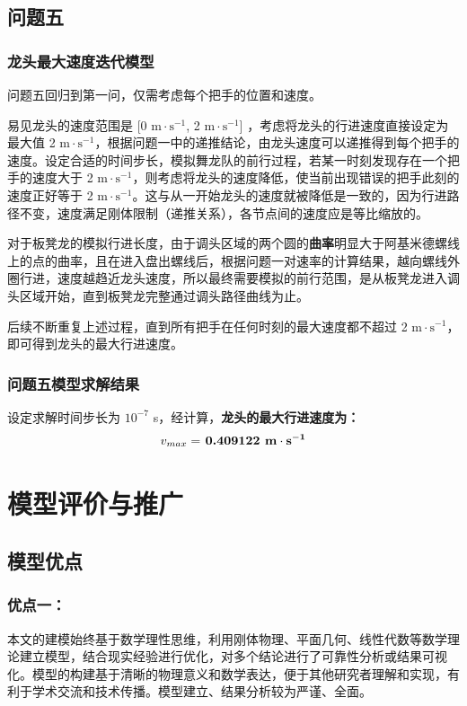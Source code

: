 \documentclass[zihao=-4, UTF8]{article}		%
\theoremstyle{MyLineTheoremStyle} %
\theoremstyle{MyBlockTheoremStyle} %
\theoremstyle{MySubsubsectionStyle} %
\begin{document}
\subsection{问题五}

\subsubsection{龙头最大速度迭代模型}

问题五回归到第一问，仅需考虑每个把手的位置和速度。

易见龙头的速度范围是 [0 $\mathrm{m\cdot s^{-1}}$, 2 $\mathrm{m\cdot s^{-1}}$] ，考虑将龙头的行进速度直接设定为最大值 2 $\mathrm{m\cdot s^{-1}}$，根据问题一中的递推结论，由龙头速度可以递推得到每个把手的速度。设定合适的时间步长，模拟舞龙队的前行过程，若某一时刻发现存在一个把手的速度大于 2 $\mathrm{m\cdot s^{-1}}$，则考虑将龙头的速度降低，使当前出现错误的把手此刻的速度正好等于 2 $\mathrm{m\cdot s^{-1}}$。这与从一开始龙头的速度就被降低是一致的，因为行进路径不变，速度满足刚体限制（递推关系），各节点间的速度应是等比缩放的。

对于板凳龙的模拟行进长度，由于调头区域的两个圆的\textbf{曲率}明显大于阿基米德螺线上的点的曲率，且在进入盘出螺线后，根据问题一对速率的计算结果，越向螺线外圈行进，速度越趋近龙头速度，所以最终需要模拟的前行范围，是从板凳龙进入调头区域开始，直到板凳龙完整通过调头路径曲线为止。

后续不断重复上述过程，直到所有把手在任何时刻的最大速度都不超过 2 $\mathrm{m\cdot s^{-1}}$，即可得到龙头的最大行进速度。

\subsubsection{问题五模型求解结果}

设定求解时间步长为 $10^{-7}$ s，经计算，\textbf{龙头的最大行进速度为：}
\begin{equation}
\text{\textbf{$v_{max}=$ 0.409122 $\mathbf{m}\cdot \mathbf{s^{-1}}$}}
\end{equation}

\section{模型评价与推广}
\subsection{模型优点}

\subsubsection{优点一：}
本文的建模始终基于数学理性思维，利用刚体物理、平面几何、线性代数等数学理论建立模型，结合现实经验进行优化，对多个结论进行了可靠性分析或结果可视化。模型的构建基于清晰的物理意义和数学表达，便于其他研究者理解和实现，有利于学术交流和技术传播。模型建立、结果分析较为严谨、全面。
\end{document}
